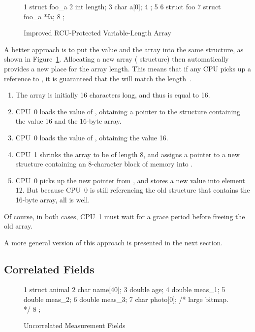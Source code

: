 \begin{figure}[tbp]
{ \scriptsize
\begin{verbbox}
 1 struct foo_a {
 2   int length;
 3   char a[0];
 4 };
 5 
 6 struct foo {
 7   struct foo_a *fa;
 8 };
\end{verbbox}
}
\centering
\theverbbox
\caption{Improved RCU-Protected Variable-Length Array}
\label{fig:together:Improved RCU-Protected Variable-Length Array}
\end{figure}

A better approach is to put the value and the array into the same structure,
as shown in
Figure~\ref{fig:together:Improved RCU-Protected Variable-Length Array}.
Allocating a new array ( structure) then automatically provides
a new place for the array length.
This means that if any CPU picks up a reference to , it is
guaranteed that the  will match the 
length~\cite{Arcangeli03}.

\begin{enumerate}
\item	The array is initially 16 characters long, and thus 
	is equal to 16.
\item	CPU~0 loads the value of , obtaining a pointer to
	the structure containing the value 16 and the 16-byte array.
\item	CPU~0 loads the value of , obtaining the value 16.
\item	CPU~1 shrinks the array to be of length 8, and assigns a pointer
	to a new  structure containing an 8-character block
	of memory into .
\item	CPU~0 picks up the new pointer from , and stores a
	new value into element 12.
	But because CPU~0 is still referencing the old 
	structure that contains the 16-byte array, all is well.
\end{enumerate}

Of course, in both cases, CPU~1 must wait for a grace period before
freeing the old array.

A more general version of this approach is presented in the next section.

\subsection{Correlated Fields}
\label{sec:together:Correlated Fields}

\begin{figure}[tbp]
{ \scriptsize
\begin{verbbox}
 1 struct animal {
 2   char name[40];
 3   double age;
 4   double meas_1;
 5   double meas_2;
 6   double meas_3;
 7   char photo[0]; /* large bitmap. */
 8 };
\end{verbbox}
}
\centering
\theverbbox
\caption{Uncorrelated Measurement Fields}
\label{fig:together:Uncorrelated Measurement Fields}
\end{figure}

